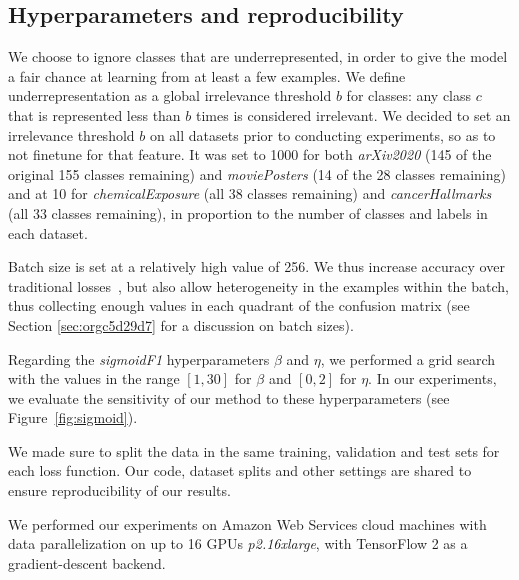 \subsection{Hyperparameters and reproducibility}
\label{subsec:hypers}

We choose to ignore classes that are underrepresented, in order to give the model a fair chance at learning from at least a few examples. We define underrepresentation as a global irrelevance threshold $b$ for classes: any class $c$ that is represented less than $b$ times is considered irrelevant. We decided to set an irrelevance threshold $b$ on all datasets prior to conducting experiments, so as to not finetune for that feature. It was set to 1000 for both \emph{arXiv2020} (145 of the original 155 classes remaining) and \emph{moviePosters} (14 of the 28 classes remaining) and at 10 for \emph{chemicalExposure} (all 38 classes remaining) and \emph{cancerHallmarks} (all 33 classes remaining), in proportion to the number of classes and labels in each dataset.

Batch size is set at a relatively high value of 256. We thus increase accuracy over traditional losses~\cite{bigBSArxiv}, but also allow heterogeneity in the examples within the batch, thus collecting enough values in each quadrant of the confusion matrix (see Section \ref{sec:orgc5d29d7} for a discussion on batch sizes).

Regarding the \emph{sigmoidF1} hyperparameters $\beta$ and $\eta$, we performed a grid search with the values in the range $[1,30]$ for $\beta$ and $[0, 2]$ for $\eta$.
In our experiments, we evaluate the sensitivity of our method to these hyperparameters (see Figure~\ref{fig:sigmoid}).

We made sure to split the data in the same training, validation and test sets for each loss function. Our code, dataset splits and other settings are shared to ensure reproducibility of our results.

We performed our experiments on Amazon Web Services cloud machines with data parallelization on up to 16 GPUs \textit{p2.16xlarge}, with TensorFlow 2 as a gradient-descent backend.
